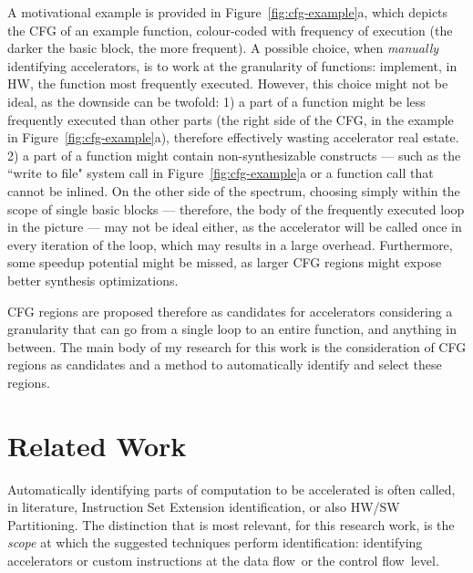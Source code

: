 \documentclass[]{usiinfthesis}
\newcommand{\dataflow}{data flow}
\newcommand{\controlflow}{control flow}
\begin{document}
A motivational example is provided in Figure~\ref{fig:cfg-example}a,
which depicts the CFG of an example function, colour-coded with
frequency of execution (the darker the basic block, the more
frequent). A possible choice, when \emph{manually} identifying
accelerators, is to work at the granularity of functions: implement,
in HW, the function most frequently executed. However, this choice
might not be ideal, as the downside can be twofold: 1) a part of a
function might be less frequently executed than other parts (the right
side of the CFG, in the example in Figure~\ref{fig:cfg-example}a),
therefore effectively wasting accelerator real estate. 2) a part of a
function might contain non-synthesizable constructs --- such as the
``write to file" system call in Figure~\ref{fig:cfg-example}a or a function 
call that cannot be inlined.  On the
other side of the spectrum, choosing simply within the scope of single
basic blocks --- therefore, the body of the frequently executed loop
in the picture --- may not be ideal either, as the accelerator will be
called once in every iteration of the loop, which may results in a
large overhead. Furthermore, some speedup potential might be missed,
as larger CFG regions might expose better synthesis optimizations.\par

CFG regions are proposed therefore as candidates for
accelerators considering a granularity that can go from a
single loop to an entire function, and anything in between. 
The main body of my research for this work is the consideration 
of CFG regions as candidates and a method to 
automatically identify and select these regions.

\section{Related Work}
\label{sec:rw}

Automatically identifying parts of computation to be
accelerated is often called, in literature, Instruction Set Extension
identification, or also HW/SW Partitioning. The distinction that is most 
relevant, for this research work, is the
\emph{scope} at which the suggested techniques perform identification: 
identifying accelerators or custom instructions at the \dataflow\ or
the \controlflow\ level.\par
\end{document}

